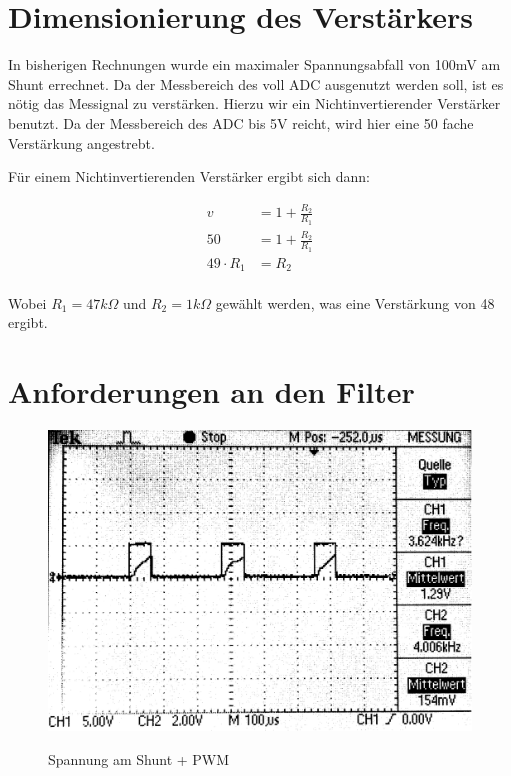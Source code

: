 \documentclass[11pt,twoside,a4paper,openright]{mpreport}
\begin{document}
\section{Dimensionierung des Verstärkers}

In bisherigen Rechnungen wurde ein maximaler Spannungsabfall von 100mV am Shunt errechnet. Da der Messbereich des voll ADC ausgenutzt werden soll,
ist es nötig das Messignal zu verstärken. Hierzu wir ein Nichtinvertierender Verstärker benutzt. Da der Messbereich des ADC bis 5V reicht, wird hier eine 
50 fache Verstärkung angestrebt.

Für einem Nichtinvertierenden Verstärker ergibt sich dann:

\begin{align*}
v &= 1 + \frac{R_2}{R_1}\\
50 &= 1 + \frac{R_2}{R_1}\\
49\cdot R_1 &= R_2
\end{align*}
\\
Wobei $R_1 = 47 k\Omega$ und $R_2 = 1 k\Omega$  gewählt werden, was eine Verstärkung von 48 ergibt.



\section{Anforderungen an den Filter}

\begin{figure}[H]
\centering
\includegraphics[width=.8\textwidth]{oszi.png}\\
\caption{Spannung am Shunt + PWM}%
\label{fig:pwm+i}
\end{figure}
\end{document}
